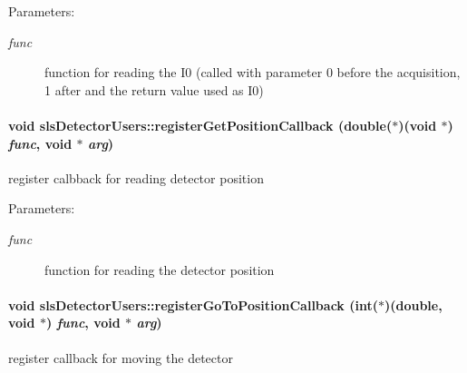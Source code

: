 \begin{Desc}
\item[Parameters:]
\begin{description}
\item[{\em func}]function for reading the I0 (called with parameter 0 before the acquisition, 1 after and the return value used as I0) \end{description}
\end{Desc}
\hypertarget{classslsDetectorUsers_c2b87416288e657a209e1374c778eb16}{
\paragraph[registerGetPositionCallback]{\setlength{\rightskip}{0pt plus 5cm}void sls\-Detector\-Users::register\-Get\-Position\-Callback (double($\ast$)(void $\ast$) {\em func}, void $\ast$ {\em arg})}\hfill}
\label{classslsDetectorUsers_c2b87416288e657a209e1374c778eb16}


register calbback for reading detector position 

\begin{Desc}
\item[Parameters:]
\begin{description}
\item[{\em func}]function for reading the detector position \end{description}
\end{Desc}
\hypertarget{classslsDetectorUsers_0f7c9bd3c46647d5dda2fa5312f3ef92}{
\paragraph[registerGoToPositionCallback]{\setlength{\rightskip}{0pt plus 5cm}void sls\-Detector\-Users::register\-Go\-To\-Position\-Callback (int($\ast$)(double, void $\ast$) {\em func}, void $\ast$ {\em arg})}\hfill}
\label{classslsDetectorUsers_0f7c9bd3c46647d5dda2fa5312f3ef92}


register callback for moving the detector 


